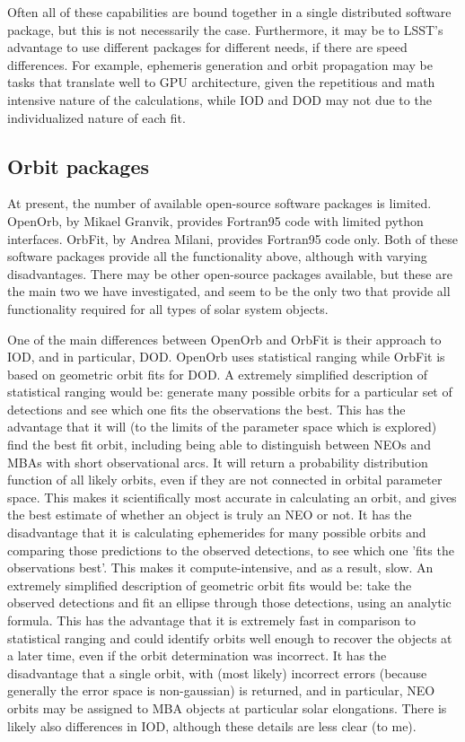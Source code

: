 Often all of these capabilities are bound together in a single distributed software package, but this is not necessarily the case. Furthermore, it may be to LSST's advantage to use different packages for different needs, if there are speed differences. For example, ephemeris generation and orbit propagation may be tasks that translate well to GPU architecture, given the repetitious and math intensive nature of the calculations, while IOD and DOD may not due to the individualized nature of each fit. 

\subsection{Orbit packages}

At present, the number of available open-source software packages is limited. OpenOrb, by Mikael Granvik, provides Fortran95 code with limited python interfaces. OrbFit, by Andrea Milani, provides Fortran95 code only. Both of these software packages provide all the functionality above, although with varying disadvantages. There may be other open-source packages available, but these are the main two we have investigated, and seem to be the only two that provide all functionality required for all types of solar system objects. 

One of the main differences between OpenOrb and OrbFit is their approach to IOD, and in particular, DOD. OpenOrb uses statistical ranging while OrbFit is based on geometric orbit fits for DOD.  A extremely simplified description of statistical ranging would be: generate many possible orbits for a particular set of detections and see which one fits the observations the best. This has the advantage that it will (to the limits of the parameter space which is explored) find the best fit orbit, including being able to distinguish between NEOs and MBAs with short observational arcs. It will return a probability distribution function of all likely orbits, even if they are not connected in orbital parameter space. This makes it scientifically most accurate in calculating an orbit, and gives the best estimate of whether an object is truly an NEO or not. It has the disadvantage that it is calculating ephemerides for many possible orbits and comparing those predictions to the observed detections, to see which one 'fits the observations best'. This makes it compute-intensive, and as a result, slow.
An extremely simplified description of geometric orbit fits would be: take the observed detections and fit an ellipse through those detections, using an analytic formula. This has the advantage that it is extremely fast in comparison to statistical ranging and could identify orbits well enough to recover the objects at a later time, even if the orbit determination was incorrect. It has the disadvantage that a single orbit, with (most likely) incorrect errors (because generally the error space is non-gaussian) is returned, and in particular, NEO orbits may be assigned to MBA objects at particular solar elongations.  There is likely also differences in IOD, although these details are less clear (to me). 

